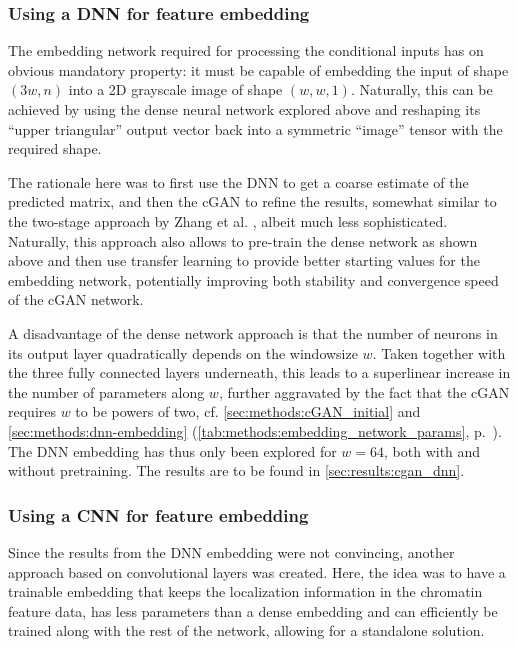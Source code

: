 \subsubsection{Using a DNN for feature embedding} \label{sec:improve:DNN_embedding}
The embedding network required for processing the conditional inputs
has on obvious mandatory property: it must be capable of embedding the input of shape $(3w,n)$ 
into a 2D grayscale image of shape $(w,w,1)$.
Naturally, this can be achieved by using the dense neural network explored above
and reshaping its ``upper triangular'' output vector back into a symmetric ``image'' tensor with the required shape.

The rationale here was to first use the DNN to get a coarse estimate of the predicted matrix,
and then the cGAN to refine the results, somewhat similar to the two-stage approach by Zhang et al. \cite{Zhang2019c},
albeit much less sophisticated. 
Naturally, this approach also allows to pre-train the dense network as shown above and then use transfer learning
to provide better starting values for the embedding network, potentially improving both stability and convergence speed
of the cGAN network.

A disadvantage of the dense network approach is that the number of neurons in its output layer quadratically depends on the windowsize $w$.
Taken together with the three fully connected layers underneath, this leads to a superlinear increase in the number of parameters along $w$,
further aggravated by the fact that the cGAN requires $w$ to be powers of two, cf. \cref{sec:methods:cGAN_initial} and  
\ref{sec:methods:dnn-embedding} (\cref{tab:methods:embedding_network_params}, p.~\pageref{tab:methods:embedding_network_params}).
The DNN embedding has thus only been explored for $w=64$, both with and without pretraining. 
The results are to be found in \cref{sec:results:cgan_dnn}.

\subsubsection{Using a CNN for feature embedding} \label{sec:improve:CNN_embedding}
Since the results from the DNN embedding were not convincing, another approach based on convolutional layers was created.
Here, the idea was to have a trainable embedding that keeps the localization information in the chromatin feature data,
has less parameters than a dense embedding and can efficiently be trained along with the rest of the network, allowing for a standalone solution.

